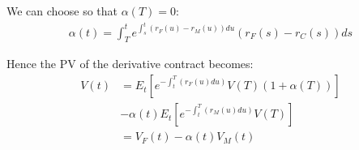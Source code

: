 \documentclass[twoside,twocolumn]{article}
\begin{document}
We can choose so that $\alpha(T)=0$:
\begin{align*}
\alpha(t)=\int_T^t e^{\int_s^t (r_{F}(u)-r_{M}(u))du} (r_{F}(s)-r_{C}(s))ds
\end{align*}

Hence the PV of the derivative contract becomes:
\begin{align*}
V(t)& = E_t[ e^{-\int_t^T(r_{F}(u) du)}V(T)(1+\alpha(T))] \\
&- \alpha(t)E_t [ e^{-\int_t^T(r_{M}(u) du)}V(T)] \\
&=V_{F}(t)-\alpha(t) V_{M}(t)
\end{align*}





\end{document}
